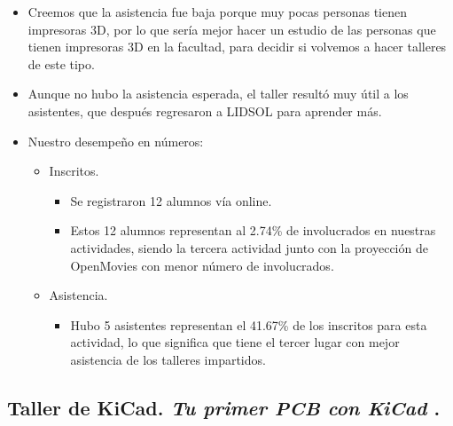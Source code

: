 \documentclass[a4paper,11pt]{article}                 %
\begin{document}
    \begin{itemize}
    \item Creemos que la asistencia fue baja porque muy pocas personas tienen impresoras 3D, por lo que sería mejor hacer un estudio de las personas que tienen impresoras 3D en la facultad, para decidir si volvemos a hacer talleres de este tipo.
    \item Aunque no hubo la asistencia esperada, el taller resultó muy útil a los asistentes, que después regresaron a LIDSOL para aprender más.
    
    \item Nuestro desempeño en números:
    
    \begin{itemize}

    
    \item Inscritos.
    \begin{itemize}
      \item Se registraron 12 alumnos vía online.
      \item Estos 12 alumnos representan al 2.74\% de involucrados en nuestras actividades, siendo la tercera actividad junto con la proyección de OpenMovies con menor número de involucrados. 
    \end{itemize}
    
    \item Asistencia.
    \begin{itemize}
      \item Hubo 5 asistentes representan el 41.67\% de los inscritos para esta actividad, lo que significa que tiene el tercer lugar con mejor asistencia de los talleres impartidos. 
    \end{itemize}
    \end{itemize} 
    
  \end{itemize}  
  \subsection{Taller de KiCad.  \textit{Tu primer PCB con KiCad} .}  
  
\end{document}
